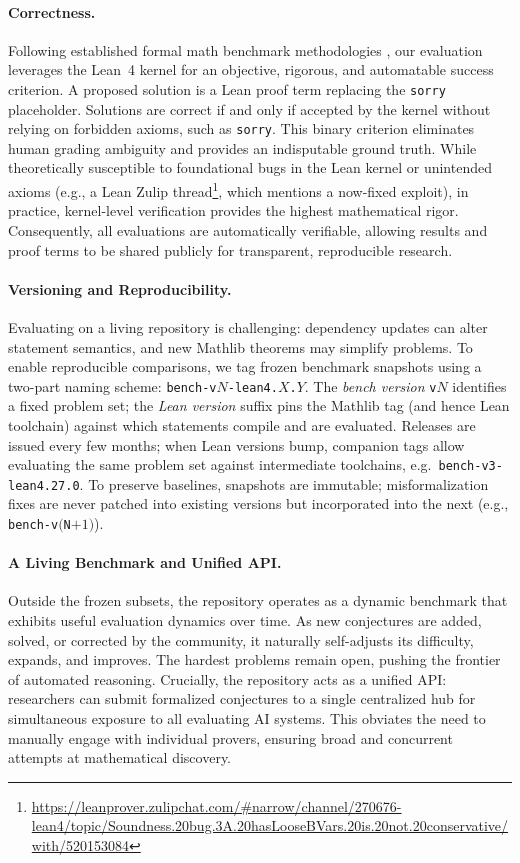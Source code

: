 \paragraph{Correctness.}
Following established formal math benchmark methodologies \citep{minif2f21, putnambench24}, our evaluation leverages the Lean~4 kernel for an objective, rigorous, and automatable success criterion.
A proposed solution is a Lean proof term replacing the \lstinline{sorry} placeholder.
Solutions are correct if and only if accepted by the kernel without relying on forbidden axioms, such as \lstinline{sorry}.
This binary criterion eliminates human grading ambiguity and provides an indisputable ground truth.
While theoretically susceptible to foundational bugs in the Lean kernel or unintended axioms (e.g., a Lean Zulip thread\footnote{\url{https://leanprover.zulipchat.com/\#narrow/channel/270676-lean4/topic/Soundness.20bug.3A.20hasLooseBVars.20is.20not.20conservative/with/520153084}}, which mentions a now-fixed exploit), in practice, kernel-level verification provides the highest mathematical rigor.
Consequently, all evaluations are automatically verifiable, allowing results and proof terms to be shared publicly for transparent, reproducible research.


\paragraph{Versioning and Reproducibility.}\label{sec:versioning}
Evaluating on a living repository is challenging: dependency updates can alter statement semantics, and new Mathlib theorems may simplify problems.
To enable reproducible comparisons, we tag frozen benchmark snapshots using a two-part naming scheme: \texttt{bench-v$N$-lean4.$X$.$Y$}.
The \emph{bench version} \texttt{v$N$} identifies a fixed problem set; the \emph{Lean version} suffix pins the Mathlib tag (and hence Lean toolchain) against which statements compile and are evaluated.
Releases are issued every few months; when Lean versions bump, companion tags allow evaluating the same problem set against intermediate toolchains, e.g.\ \texttt{bench-v3-lean4.27.0}.
To preserve baselines, snapshots are immutable; misformalization fixes are never patched into existing versions but incorporated into the next (e.g., \texttt{bench-v$($N$+1)$}).


\paragraph{A Living Benchmark and Unified API.}
Outside the frozen subsets, the repository operates as a dynamic benchmark that exhibits useful evaluation dynamics over time.
As new conjectures are added, solved, or corrected by the community, it naturally self-adjusts its difficulty, expands, and improves.
The hardest problems remain open, pushing the frontier of automated reasoning.
Crucially, the repository acts as a unified API: researchers can submit formalized conjectures to a single centralized hub for simultaneous exposure to all evaluating AI systems.
This obviates the need to manually engage with individual provers, ensuring broad and concurrent attempts at mathematical discovery.

